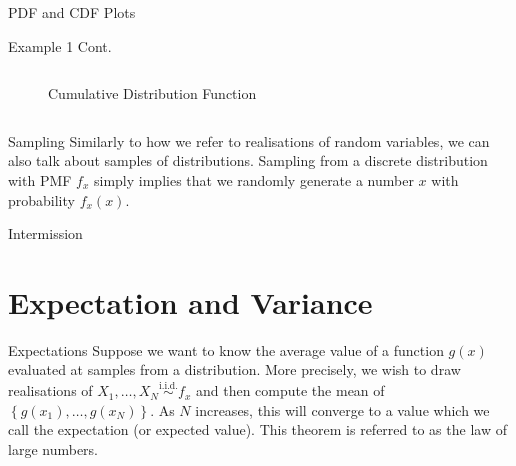 \documentclass[10pt]{beamer}
\begin{document}
\begin{frame}[fragile]{PDF and CDF Plots}
\begin{exampleblock}{Example 1 Cont.}
\begin{columns}
\begin{column}{0.425\textwidth}
\begin{figure}
    \caption{Cumulative Distribution Function}
\end{figure}
\end{column}
\end{columns}
\end{exampleblock}
\end{frame}

\begin{frame}[fragile]{Sampling}
Similarly to how we refer to realisations of random variables, we can also talk about samples of distributions. Sampling from a discrete distribution with PMF \(f_x\) simply implies that we randomly generate a number \(x\) with probability \(f_x\left(x\right)\).


\end{frame}

\begin{frame}[standout]
Intermission
\end{frame}

\section{Expectation and Variance}

\begin{frame}[fragile]{Expectations}
Suppose we want to know the average value of a function \(g\left(x\right)\) evaluated at samples from a distribution. More precisely, we wish to draw realisations of \(X_1, \dots, X_N \overset{\text{i.i.d.}}{\sim} f_x\) and then compute the mean of \(\left\{g\left(x_1\right), \dots, g\left(x_N\right)\right\}\). As \(N\) increases, this will converge to a value which we call the expectation (or expected value). This theorem is referred to as the law of large numbers.

\end{frame}
\end{document}
